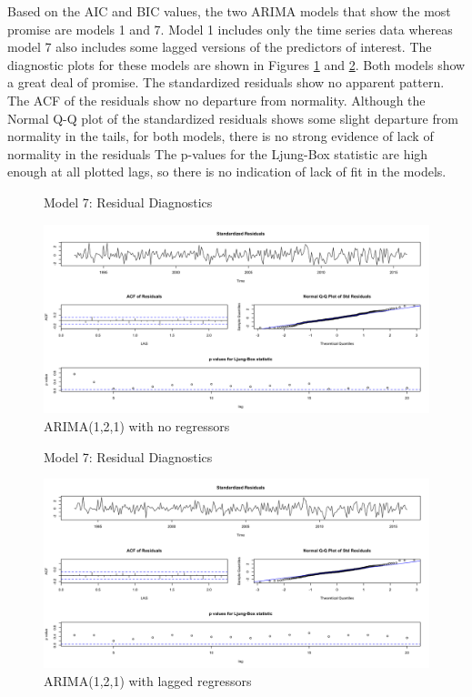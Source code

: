 \documentclass[twoside,twocolumn]{article}
\begin{document}
     	
		Based on the AIC and BIC values, the two ARIMA models that show the most promise are models 1 and 7.  Model 1 includes only the time series data whereas model 7 also includes some lagged versions of the predictors of interest.  The diagnostic plots for these models are shown in Figures \ref{fig:sarimamod1} and \ref{fig:sarimamod7}. Both models show a great deal of promise.  The standardized residuals show no apparent pattern. The ACF of the residuals show no departure from normality. Although the Normal Q-Q plot of the standardized residuals shows some slight departure from normality in the tails, for both models, there is no strong evidence of lack of normality in the residuals  The p-values for the  Ljung-Box statistic are high enough at all plotted lags, so there is no indication of lack of fit in the models. 

		    \begin{figure}[H]
    	\centering
    	\caption{Model 7: Residual Diagnostics}
     	\includegraphics[width=\linewidth]{images/sarima1}
     	\caption*{ARIMA(1,2,1) with no regressors}
     	\label{fig:sarimamod1}
     \end{figure}


    \begin{figure}[H]
    	\centering
    	\caption{Model 7: Residual Diagnostics}
     	\includegraphics[width=\linewidth]{images/sarima7}
     	\caption*{ARIMA(1,2,1) with lagged regressors}
     	\label{fig:sarimamod7}
     \end{figure}
     
\end{document}
